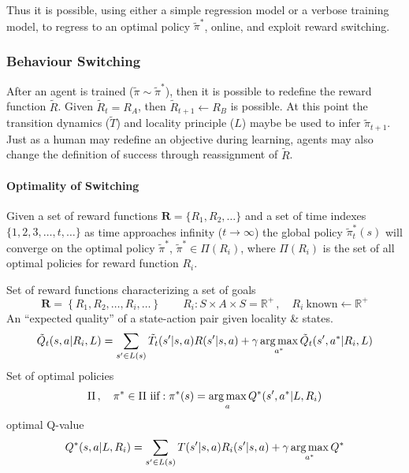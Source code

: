 Thus it is possible, using either a simple regression model or a verbose training model, to regress to an optimal policy $\tilde{\pi}^\ast$, online, and exploit reward switching.

\subsubsection{Behaviour Switching}

After an agent is trained ($\tilde{\pi}\sim\tilde{\pi}^\ast$), then it is possible to redefine the reward function $\tilde{R}$. Given $\tilde{R}_{t} = R_{A}$, then $\tilde{R}_{t+1} \leftarrow R_{B}$ is possible. At this point the transition dynamics ($\tilde{T}$) and locality principle ($L$) maybe be used to infer $\tilde{\pi}_{t+1}$. Just as a human may redefine an objective during learning, agents may also change the definition of success through reassignment of $\tilde{R}$.

\paragraph{Optimality of Switching}

Given a set of reward functions $\mathbf{R}=\{R_1, R_2, \ldots \}$ and a set of time indexes $\{ 1, 2, 3, \ldots, t, \ldots \}$ as time approaches infinity ($t \to \infty$) the global policy $\tilde{\pi}^\ast_{t}(s)$ will converge on the optimal policy $\tilde{\pi}^\ast$, $\tilde{\pi}^\ast \in \Pi(R_i)$, where $\Pi(R_i)$ is the set of all optimal policies for reward function $R_i$.


Set of reward functions characterizing a set of goals
\begin{equation}
\mathbf{R}=\left\{ R_1, R_2, \ldots, R_i, \ldots \right\}\qquad R_i: S \times A \times S  = \mathbb{R}^{+}\,, \quad R_i\:\text{known} \leftarrow \mathbb{R}^{+}
\end{equation}
An ``expected quality'' of a state-action pair given locality \& states.
\begin{equation}
\tilde{Q}_t( s, a | R_i, L ) = \sum_{s^\prime \in L( s )} \tilde{T}_t( s^\prime | s, a) R( s^\prime | s, a ) + \gamma \operatorname*{arg\,max}_{a^{*}} \tilde{Q}_{t}( s^\prime, a^\ast | R_i, L )
\end{equation}
Set of optimal policies
\begin{equation}
\Pi\,,\quad \pi^{*} \in \Pi \text{\ iif}: \pi^{\ast}( s ) = \operatorname*{arg\,max}_{a} Q^{\ast}( s^\prime, a^{\ast} | L, R_i )
\end{equation}
optimal Q-value
\begin{equation}
Q^{\ast}( s, a | L, R_i  ) = \sum_{s^\prime \in L( s )} T( s^{\prime} | s, a ) R_i( s^\prime | s, a ) + \gamma \operatorname*{arg\,max}_{a^{\ast}} Q^{\ast}
\end{equation}

